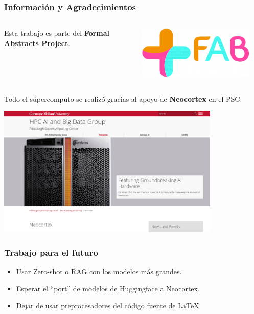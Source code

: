 \documentclass[10pt]{beamer}
\begin{document}
\begin{frame}
    \frametitle{Información y Agradecimientos}
    \begin{columns}
        \begin{column}{0.6\textwidth}
            Esta trabajo es parte del \textbf{Formal Abstracts Project}.
        \end{column}
        \begin{column}{0.4\textwidth}
            \begin{center}
                \includegraphics[width=0.9\textwidth]{../Images/fabstracts2.png}
            \end{center}
        \end{column}
    \end{columns}
        \pause
        Todo el súpercomputo se realizó gracias al apoyo de \textbf{Neocortex} en el PSC 
            \begin{center}
                \includegraphics[width=0.8\textwidth]{../Images/neocortex_pic.png}
            \end{center}
\end{frame}

\begin{frame}
    \frametitle{Trabajo para el futuro}
    \begin{itemize}
        \item Usar Zero-shot o RAG con los modelos más grandes.
            \pause
        \item Esperar el ``port'' de modelos de Huggingface a Neocortex.
            \pause
        \item Dejar de usar preprocesadores del código fuente de \LaTeX{}.
    \end{itemize}
\end{frame}

\begin{frame}
\titlepage
\end{frame}
\end{document}
